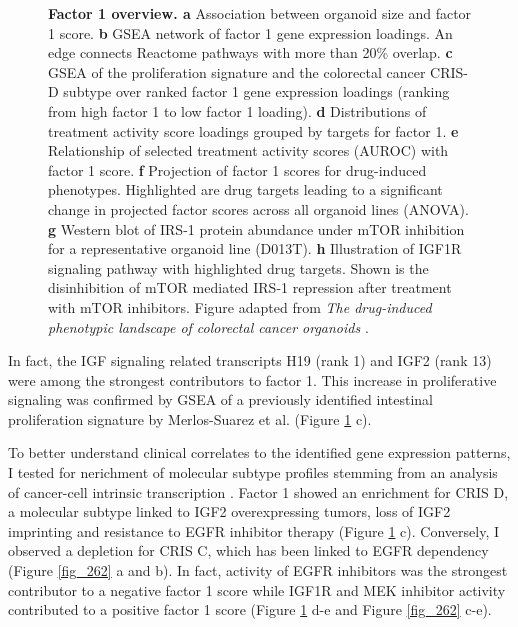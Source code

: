 \begin{flushleft}
\begin{figure}[h!]
\caption[Factor 1 overview]{\textbf{Factor 1 overview. a} Association between organoid size and factor 1 score. \textbf{b} GSEA network of factor 1 gene expression loadings. An edge connects Reactome pathways with more than 20\% overlap. \textbf{c} GSEA of the proliferation signature and the colorectal cancer CRIS-D subtype over ranked factor 1 gene expression loadings (ranking from high factor 1 to low factor 1 loading). \textbf{d} Distributions of treatment activity score loadings grouped by targets for factor 1. \textbf{e} Relationship of selected treatment activity scores (AUROC) with factor 1 score. \textbf{f} Projection of factor 1 scores for drug-induced phenotypes. Highlighted are drug targets leading to a significant change in projected factor scores across all organoid lines (ANOVA). \textbf{g} Western blot of IRS-1 protein abundance under mTOR inhibition for a representative organoid line (D013T). \textbf{h} Illustration of IGF1R signaling pathway with highlighted drug targets. Shown is the disinhibition of mTOR mediated IRS-1 repression after treatment with mTOR inhibitors. Figure adapted from \textit{The drug-induced phenotypic landscape of colorectal cancer organoids} \cite{Betge2022-kr}.}
\label{fig_261}
\end{figure}
\bigbreak

In fact, the IGF signaling related transcripts H19 (rank 1) and IGF2 (rank 13) were among the strongest contributors to factor 1. This increase in proliferative signaling was confirmed by GSEA of a previously identified intestinal proliferation signature by Merlos-Suarez et al. \cite{Merlos-Suarez2011-gd} (Figure \ref{fig_261} c). 

\bigbreak
To better understand clinical correlates to the identified gene expression patterns, I tested for nerichment of molecular subtype profiles stemming from an analysis of cancer-cell intrinsic transcription \cite{Isella2017-bm}. Factor 1 showed an enrichment for CRIS D, a molecular subtype linked to IGF2 overexpressing tumors, loss of IGF2 imprinting and resistance to EGFR inhibitor therapy (Figure \ref{fig_261} c). Conversely, I observed a depletion for CRIS C, which has been linked to EGFR dependency (Figure \ref{fig_262} a and b). In fact, activity of EGFR inhibitors was the strongest contributor to a negative factor 1 score while IGF1R and MEK inhibitor activity contributed to a positive factor 1 score (Figure \ref{fig_261} d-e and Figure \ref{fig_262} c-e).


\end{flushleft}

